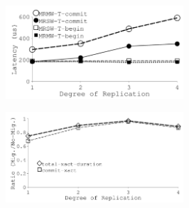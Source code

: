{
\begin{figure}[th]
\begin{minipage}{\figWidth}
\begin{center}
\centerline{\includegraphics[width=2.6in]{Figures/g_plot_FAST_replica.pdf}}
{
}
\end{center}
\end{minipage}
\begin{minipage}{\figSep}
\hspace{\figSep}
\end{minipage}
\begin{minipage}{\figWidth}
\begin{center}
\centerline{\includegraphics[width=2.6in]{Figures/g_plot_FAST_replica_zipf.pdf}}
{
}
\end{center}
\end{minipage}
\end{figure}
}
